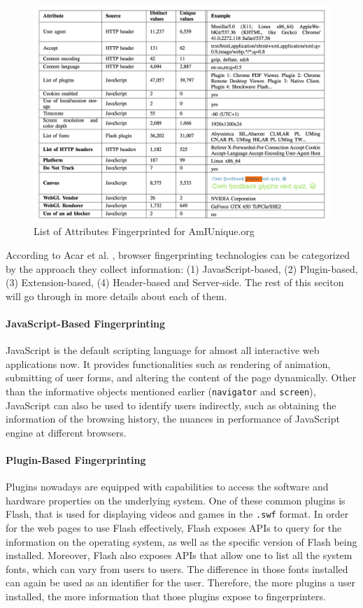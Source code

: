 \documentclass{acm_proc_article-sp}
\begin{document}
\begin{figure}[h]
    \centering
    \includegraphics[width=\textwidth]{assets/amiunique.png}
    \caption{List of Attributes Fingerprinted for AmIUnique.org}
    \label{fig:amiunique}
\end{figure}


According to Acar et al. \cite{acar:fpd}, browser fingerprinting technologies can be categorized by the approach they collect information: (1) JavasScript-based, (2) Plugin-based, (3) Extension-based, (4) Header-based and Server-side.
The rest of this seciton will go through in more details about each of them.

\paragraph{JavaScript-Based Fingerprinting}
JavaScript is the default scripting language for almost all interactive web applications now. It provides functionalities such as rendering of animation, submitting of user forms, and altering the content of the page dynamically. 
Other than the informative objects mentioned earlier (\verb|navigator| and \verb|screen|), JavaScript can also be used to identify users indirectly, such as obtaining the information of the browsing history, the nuances in performance of JavaScript engine at different browsers.

\paragraph{Plugin-Based Fingerprinting}
Plugins nowadays are equipped with capabilities to access the software and hardware properties on the underlying system. One of these common plugins is Flash, that is used for displaying videos and games in the \verb|.swf| format. In order for the web pages to use Flash effectively, Flash exposes APIs to query for the information on the operating system, as well as the specific version of Flash being installed.
Moreover, Flash also exposes APIs that allow one to list all the system fonts, which can vary from users to users. The difference in those fonts installed can again be used as an identifier for the user.
Therefore, the more plugins a user installed, the more information that those plugins expose to fingerprinters.
\end{document}

